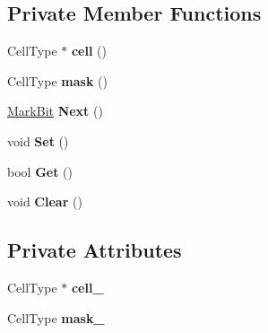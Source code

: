 \subsection*{Private Member Functions}
\begin{DoxyCompactItemize}
\item 
Cell\+Type $\ast$ {\bfseries cell} ()\hypertarget{classv8_1_1internal_1_1_mark_bit_a9cac031508486151e3cb30731f8d8a67}{}\label{classv8_1_1internal_1_1_mark_bit_a9cac031508486151e3cb30731f8d8a67}

\item 
Cell\+Type {\bfseries mask} ()\hypertarget{classv8_1_1internal_1_1_mark_bit_a8accee6a39ea07c3737b77c86d5b9b19}{}\label{classv8_1_1internal_1_1_mark_bit_a8accee6a39ea07c3737b77c86d5b9b19}

\item 
\hyperlink{classv8_1_1internal_1_1_mark_bit}{Mark\+Bit} {\bfseries Next} ()\hypertarget{classv8_1_1internal_1_1_mark_bit_abbf1fd5c72d8abc1e4063e1adca84965}{}\label{classv8_1_1internal_1_1_mark_bit_abbf1fd5c72d8abc1e4063e1adca84965}

\item 
void {\bfseries Set} ()\hypertarget{classv8_1_1internal_1_1_mark_bit_adda04986b25426477243ca94a756600c}{}\label{classv8_1_1internal_1_1_mark_bit_adda04986b25426477243ca94a756600c}

\item 
bool {\bfseries Get} ()\hypertarget{classv8_1_1internal_1_1_mark_bit_a23f900f77547dd64ec77ef413607a0e5}{}\label{classv8_1_1internal_1_1_mark_bit_a23f900f77547dd64ec77ef413607a0e5}

\item 
void {\bfseries Clear} ()\hypertarget{classv8_1_1internal_1_1_mark_bit_ae957b539a0baa239a7dba09508735227}{}\label{classv8_1_1internal_1_1_mark_bit_ae957b539a0baa239a7dba09508735227}

\end{DoxyCompactItemize}
\subsection*{Private Attributes}
\begin{DoxyCompactItemize}
\item 
Cell\+Type $\ast$ {\bfseries cell\+\_\+}\hypertarget{classv8_1_1internal_1_1_mark_bit_a0907f8bf3d26d1f95dc145d1e1024ce3}{}\label{classv8_1_1internal_1_1_mark_bit_a0907f8bf3d26d1f95dc145d1e1024ce3}

\item 
Cell\+Type {\bfseries mask\+\_\+}\hypertarget{classv8_1_1internal_1_1_mark_bit_acb963ca8545244077384db84335e4cd1}{}\label{classv8_1_1internal_1_1_mark_bit_acb963ca8545244077384db84335e4cd1}

\end{DoxyCompactItemize}
